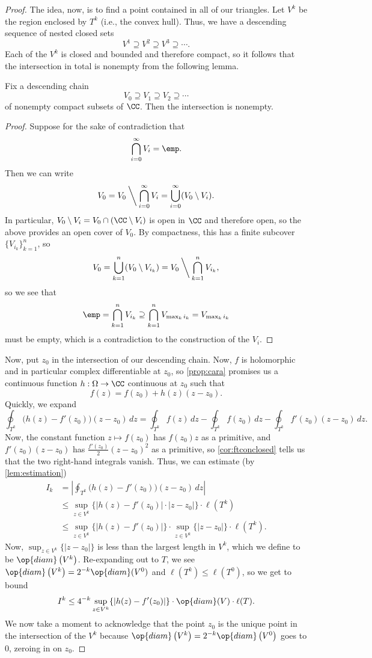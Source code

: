 \begin{proof}
	The idea, now, is to find a point contained in all of our triangles. Let $V^k$ be the region enclosed by $T^k$ (i.e., the convex hull). Thus, we have a descending sequence of nested closed sets
	\[V^1\supseteq V^2\supseteq V^3\supseteq\cdots.\]
	Each of the $V^k$ is closed and bounded and therefore compact, so it follows that %
	the intersection in total is nonempty from the following lemma.
	\begin{lemma}
		Fix a descending chain
		\[V_0\supseteq V_1\supseteq V_2\supseteq\cdots\]
		of nonempty compact subsets of $\CC$. Then the intersection is nonempty.
	\end{lemma}
	\begin{proof}
		Suppose for the sake of contradiction that
		\[\bigcap_{i=0}^\infty V_i=\emp.\]
		Then we can write
		\[V_0=V_0\mathbin{\bigg\backslash}\bigcap_{i=0}^\infty V_i=\bigcup_{i=0}^\infty(V_0\setminus V_i).\]
		In particular, $V_0\setminus V_i=V_0\cap(\CC\setminus V_i)$ is open in $\CC$ and therefore open, so the above provides an open cover of $V_0$. By compactness, this has a finite subcover $\{V_{i_k}\}_{k=1}^n$, so
		\[V_0=\bigcup_{k=1}^n(V_0\setminus V_{i_k})=V_0\mathbin{\bigg\backslash}\bigcap_{k=1}^nV_{i_k},\]
		so we see that
		\[\emp=\bigcap_{k=1}^nV_{i_k}\supseteq\bigcap_{k=1}^nV_{\max_ki_k}=V_{\max_ki_k}\]
		must be empty, which is a contradiction to the construction of the $V_i$.
	\end{proof}
	Now, put $z_0$ in the intersection of our descending chain. Now, $f$ is holomorphic and in particular complex differentiable at $z_0$, so \autoref{prop:cara} promises us a continuous function $h:\Omega\to\CC$ continuous at $z_0$ such that
	\[f(z)=f(z_0)+h(z)(z-z_0).\]
	Quickly, we expand
	\[\oint_{T^k}\big(h(z)-f'(z_0)\big)(z-z_0)\,dz=\oint_{T^k}f(z)\,dz-\oint_{T^k}f(z_0)\,dz-\oint_{T^k}f'(z_0)(z-z_0)\,dz.\]
	Now, the constant function $z\mapsto f(z_0)$ has $f(z_0)z$ as a primitive, and $f'(z_0)(z-z_0)$ has $\frac{f'(z_0)}2(z-z_0)^2$ as a primitive, so \autoref{cor:ftconclosed} tells us that the two right-hand integrals vanish. Thus, we can estimate (by \autoref{lem:estimation})
	\begin{align*}
		I_k &= \left|\oint_{T^k}\big(h(z)-f'(z_0)\big)(z-z_0)\,dz\right| \\
		&\le \sup_{z\in V^k}\{|h(z)-f'(z_0)|\cdot|z-z_0|\}\cdot\ell\left(T^k\right) \\
		&\le \sup_{z\in V^k}\{|h(z)-f'(z_0)|\} \cdot\sup_{z\in V^k}\{|z-z_0|\}\cdot\ell\left(T^k\right).
	\end{align*}
	Now, $\sup_{z\in V^k}\{|z-z_0|\}$ is less than the largest length in $V^k$, which we define to be $\op{diam}\left(V^k\right)$. Re-expanding out to $T$, we see $\op{diam}\left(V^k\right)=2^{-k}\op{diam}(V^0)$ and $\ell\left(T^k\right)\le\ell(T^0)$, so we get to bound
	\[I^k\le 4^{-k}\sup_{z\in V^k}\{|h(z)-f'(z_0)|\}\cdot\op{diam}(V)\cdot\ell(T).\]
	We now take a moment to acknowledge that the point $z_0$ is the unique point in the intersection of the $V^k$ because $\op{diam}\left(V^k\right)=2^{-k}\op{diam}\left(V^0\right)$ goes to $0$, zeroing in on $z_0$.


\end{proof}
